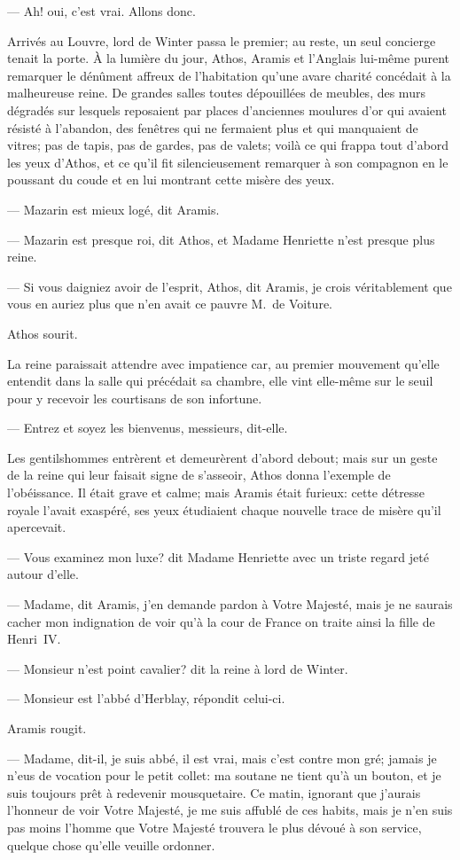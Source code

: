 — Ah! oui, c'est vrai. Allons donc.


Arrivés au Louvre, lord de Winter passa le premier; au reste, un seul concierge tenait la porte. À la lumière du jour, Athos, Aramis et l'Anglais lui-même purent remarquer le dénûment affreux de l'habitation qu'une avare charité concédait à la malheureuse reine. De grandes salles toutes dépouillées de meubles, des murs dégradés sur lesquels reposaient par places d'anciennes moulures d'or qui avaient résisté à l'abandon, des fenêtres qui ne fermaient plus et qui manquaient de vitres; pas de tapis, pas de gardes, pas de valets; voilà ce qui frappa tout d'abord les yeux d'Athos, et ce qu'il fit silencieusement remarquer à son compagnon en le poussant du coude et en lui montrant cette misère des yeux.

— Mazarin est mieux logé, dit Aramis.

— Mazarin est presque roi, dit Athos, et Madame Henriette n'est presque plus reine.

— Si vous daigniez avoir de l'esprit, Athos, dit Aramis, je crois véritablement que vous en auriez plus que n'en avait ce pauvre M.~de Voiture.

Athos sourit.

La reine paraissait attendre avec impatience car, au premier mouvement qu'elle entendit dans la salle qui précédait sa chambre, elle vint elle-même sur le seuil pour y recevoir les courtisans de son infortune.

— Entrez et soyez les bienvenus, messieurs, dit-elle.

Les gentilshommes entrèrent et demeurèrent d'abord debout; mais sur un geste de la reine qui leur faisait signe de s'asseoir, Athos donna l'exemple de l'obéissance. Il était grave et calme; mais Aramis était furieux: cette détresse royale l'avait exaspéré, ses yeux étudiaient chaque nouvelle trace de misère qu'il apercevait.

— Vous examinez mon luxe? dit Madame Henriette avec un triste regard jeté autour d'elle.

— Madame, dit Aramis, j'en demande pardon à Votre Majesté, mais je ne saurais cacher mon indignation de voir qu'à la cour de France on traite ainsi la fille de Henri~IV.

— Monsieur n'est point cavalier? dit la reine à lord de Winter.

— Monsieur est l'abbé d'Herblay, répondit celui-ci.

Aramis rougit.

— Madame, dit-il, je suis abbé, il est vrai, mais c'est contre mon gré; jamais je n'eus de vocation pour le petit collet: ma soutane ne tient qu'à un bouton, et je suis toujours prêt à redevenir mousquetaire. Ce matin, ignorant que j'aurais l'honneur de voir Votre Majesté, je me suis affublé de ces habits, mais je n'en suis pas moins l'homme que Votre Majesté trouvera le plus dévoué à son service, quelque chose qu'elle veuille ordonner.

